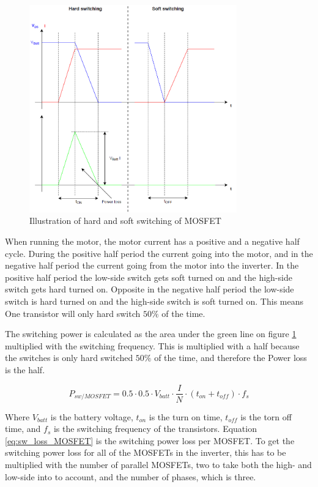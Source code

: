     \begin{figure}[H]
		\centering
		\includegraphics[width=0.8\textwidth]{pictures/hardware/Power_Board/Hard_soft_switching.PNG}
		\caption{Illustration of hard and soft switching of MOSFET}
		\label{fig:HardSoftSwitch}
	\end{figure} 

When running the motor, the motor current has a positive and a negative half cycle. During the positive half period the current going into the motor, and in the negative half period the current going from the motor into the inverter. In the positive half period the low-side switch gets soft turned on and the high-side switch gets hard turned on. Opposite in the negative half period the low-side switch is hard turned on and the high-side switch is soft turned on. This means One transistor will only hard switch $50 \%$ of the time.

The switching power is calculated as the area under the green line on figure \ref{fig:HardSoftSwitch} multiplied with the switching frequency. This is multiplied with a half because the switches is only hard switched $50 \%$ of the time, and therefore the Power loss is the half. 

    \begin{equation}
        P_{sw/MOSFET} = 0.5 \cdot 0.5 \cdot V_{batt} \cdot \frac{I}{N} \cdot (t_{on}+t_{off}) \cdot f_{s}
        \label{eq:sw_loss_MOSFET}
    \end{equation}

Where $V_{batt}$ is the battery voltage, $t_{on}$ is the turn on time, $t_{off}$ is the torn off time, and $f_{s}$ is the switching frequency of the transistors.
Equation \ref{eq:sw_loss_MOSFET} is the switching power loss per MOSFET. To get the switching power loss for all of the MOSFETs in the inverter, this has to be multiplied with the number of parallel MOSFETs, two to take both the high- and low-side into to account, and the number of phases, which is three.


